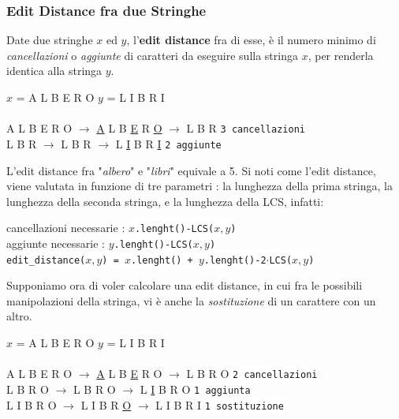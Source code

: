 \documentclass[12pt, letterpaper]{article}
\newcommand{\codee}[1]{\colorbox{white}{\texttt{#1}}}
\newcommand{\acc}{\\\hphantom{}\\}
\begin{document}
\subsubsection{Edit Distance fra due Stringhe}
Date due stringhe $x$ ed $y$, l'\textbf{edit distance} fra di esse, è il numero minimo di \textit{cancellazioni} o 
\textit{aggiunte} di caratteri da eseguire sulla stringa $x$, per renderla identica alla stringa $y$.\begin{center}
    $x$ = A L B E R O \hphantom{spaziospazio}
    $y$ = L I B R I \acc 
    A L B E R O $\longrightarrow$   \color{red}\underline{A} \color{black} L B \color{red}\underline{E} \color{black} R \underline{O} $\longrightarrow$ L B R \hphantom{spazio} \codee{3 cancellazioni}\\ 
    L B R $\longrightarrow$ L \underline{\hphantom{a}} B R \underline{\hphantom{a}} $\longrightarrow$ L  \color{green}\underline{I} \color{black} B R  \color{green}\underline{I} \color{black}\hphantom{spazio} \codee{2 aggiunte}
\end{center}
L'edit distance fra "\textit{albero}" e "\textit{libri}" equivale a 5. Si noti come l'edit distance, viene valutata 
in funzione di tre parametri : la lunghezza della prima stringa, la lunghezza della seconda stringa, e la lunghezza 
della LCS, infatti:\begin{center}
    cancellazioni necessarie : \codee{$x$.lenght()-LCS($x,y$)}\\ 
    aggiunte necessarie : \codee{$y$.lenght()-LCS($x,y$)}\\ 
    \codee{edit\_distance($x,y$) = $x$.lenght() + $y$.lenght()-2$\cdot$LCS($x,y$)}
\end{center}
Supponiamo ora di voler calcolare una edit distance, in cui fra le possibili manipolazioni della stringa, vi è anche 
la \textit{sostituzione} di un carattere con un altro.
\begin{center}
    $x$ = A L B E R O \hphantom{spaziospazio}
    $y$ = L I B R I \acc 
    A L B E R O $\longrightarrow$   \color{red}\underline{A} \color{black} L B \color{red}\underline{E} \color{black} R O $\longrightarrow$ L B R O \hphantom{spazio} \codee{2 cancellazioni}\\ 
    L B R O $\longrightarrow$ L \underline{\hphantom{a}} B R O $\longrightarrow$ L  \color{green}\underline{I} \color{black} B R  O \hphantom{spazio} \codee{1 aggiunta}\\ 
    L I B R O $\longrightarrow$ L I B R \underline{O} $\longrightarrow$ L I B R \color{orange}I \color{black}   \hphantom{spazio} \codee{1 sostituzione}
\end{center}
\end{document}
